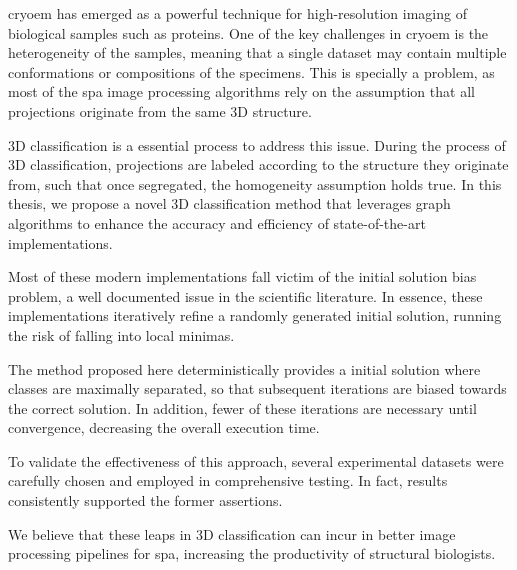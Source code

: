 \documentclass[../main.tex]{subfiles}
\begin{document}
\Gls{cryoem} has emerged as a powerful technique for high-resolution imaging of biological samples such as proteins. One of the key challenges in \gls{cryoem} is the heterogeneity of the samples, meaning that a single dataset may contain multiple conformations or compositions of the specimens. This is specially a problem, as most of the \gls{spa} image processing algorithms rely on the assumption that all projections originate from the same 3D structure. 

3D classification is a essential process to address this issue. During the process of 3D classification, projections are labeled according to the structure they originate from, such that once segregated, the homogeneity assumption holds true. In this thesis, we propose a novel 3D classification method that leverages graph algorithms to enhance the accuracy and efficiency of state-of-the-art implementations.

Most of these modern implementations fall victim of the initial solution bias problem, a well documented issue in the scientific literature. In essence, these implementations iteratively refine a randomly generated initial solution, running the risk of falling into local minimas. 

The method proposed here deterministically provides a initial solution where classes are maximally separated, so that subsequent iterations are biased towards the correct solution. In addition, fewer of these iterations are necessary until convergence, decreasing the overall execution time.

To validate the effectiveness of this approach, several experimental datasets were carefully chosen and employed in comprehensive testing. In fact, results consistently supported the former assertions. 

We believe that these leaps in 3D classification can incur in better image processing pipelines for \gls{spa}, increasing the productivity of structural biologists.
\end{document}
